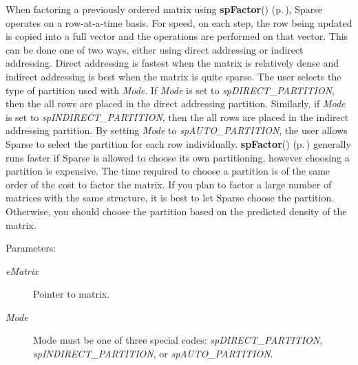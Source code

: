 When factoring a previously ordered matrix using {\bf sp\-Factor}() {\rm (p.\,\pageref{spFactor_8c_a25})}, Sparse operates on a row-at-a-time basis. For speed, on each step, the row being updated is copied into a full vector and the operations are performed on that vector. This can be done one of two ways, either using direct addressing or indirect addressing. Direct addressing is fastest when the matrix is relatively dense and indirect addressing is best when the matrix is quite sparse. The user selects the type of partition used with {\em Mode}. If {\em Mode} is set to {\em sp\-DIRECT\_\-PARTITION}, then the all rows are placed in the direct addressing partition. Similarly, if {\em Mode} is set to {\em sp\-INDIRECT\_\-PARTITION}, then the all rows are placed in the indirect addressing partition. By setting {\em Mode} to {\em sp\-AUTO\_\-PARTITION}, the user allows Sparse to select the partition for each row individually. {\bf sp\-Factor}() {\rm (p.\,\pageref{spFactor_8c_a25})} generally runs faster if Sparse is allowed to choose its own partitioning, however choosing a partition is expensive. The time required to choose a partition is of the same order of the cost to factor the matrix. If you plan to factor a large number of matrices with the same structure, it is best to let Sparse choose the partition. Otherwise, you should choose the partition based on the predicted density of the matrix.\begin{Desc}
\item[Parameters: ]\par
\begin{description}
\item[{\em 
e\-Matrix}]Pointer to matrix. \item[{\em 
Mode}]Mode must be one of three special codes: {\em sp\-DIRECT\_\-PARTITION}, {\em sp\-INDIRECT\_\-PARTITION}, or {\em sp\-AUTO\_\-PARTITION}. \end{description}
\end{Desc}
